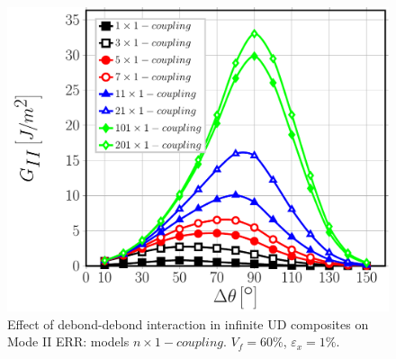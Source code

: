 \documentclass[review]{elsarticle}
\begin{document}
\begin{figure}[!h]
\centering
\includegraphics[width=\textwidth]{nx1-coupling-vf60-GII.pdf}
\caption{Effect of debond-debond interaction in infinite UD composites on Mode II ERR: models $n\times 1-coupling$. $V_{f}=60\%$, $\varepsilon_{x}=1\%$.}\label{fig:verticalGII}
\end{figure}
\end{document}
